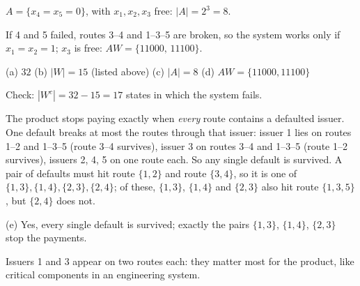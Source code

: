 	 $A=\{x_4=x_5=0\}$, with $x_1,x_2,x_3$ free: $|A|=2^3=8$.

	 If 4 and 5 failed, routes 3--4 and 1--3--5 are broken, so the
	system works only if $x_1=x_2=1$; $x_3$ is free:
	$AW=\{11000,\,11100\}$.
	\begin{answer}
		(a) $32$ \quad (b) $|W|=15$ (listed above) \quad (c) $|A|=8$ \quad
		(d) $AW=\{11000,11100\}$
	\end{answer}
	\begin{remark}
		Check: $|W^c|=32-15=17$ states in which the system fails.
	\end{remark}

	 The product stops paying exactly when
	\emph{every} route contains a defaulted issuer. One default breaks at most the
	routes through that issuer: issuer 1 lies on routes 1--2 and 1--3--5 (route
	3--4 survives), issuer 3 on routes 3--4 and 1--3--5 (route 1--2 survives),
	issuers 2, 4, 5 on one route each. So any single default is survived. A pair
	of defaults must hit route $\{1,2\}$ and route $\{3,4\}$, so it is one of
	$\{1,3\},\{1,4\},\{2,3\},\{2,4\}$; of these, $\{1,3\}$, $\{1,4\}$ and
	$\{2,3\}$ also hit route $\{1,3,5\}$, but $\{2,4\}$ does not.
	\begin{answer}
		(e) Yes, every single default is survived; exactly the pairs $\{1,3\}$,
		$\{1,4\}$, $\{2,3\}$ stop the payments.
	\end{answer}
	\begin{remark}
		Issuers 1 and 3 appear on two routes each: they matter most for the
		product, like critical components in an engineering system.
	\end{remark}
\fi
